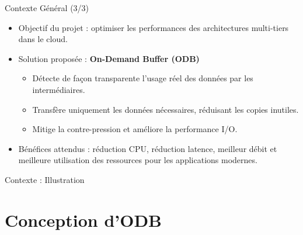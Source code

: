 \documentclass[aspectratio=43,8pt]{beamer}
\begin{document}
\begin{frame}{Contexte Général (3/3)}
    \begin{card}
        \begin{itemize}
            \item Objectif du projet : optimiser les performances des architectures multi-tiers dans le cloud.
            \item Solution proposée : \textbf{On-Demand Buffer (ODB)}
            \begin{itemize}
                \item Détecte de façon transparente l’usage réel des données par les intermédiaires.
                \item Transfère uniquement les données nécessaires, réduisant les copies inutiles.
                \item Mitige la contre-pression et améliore la performance I/O.
            \end{itemize}
            \item Bénéfices attendus : réduction CPU, réduction latence, meilleur débit et meilleure utilisation des ressources pour les applications modernes.
        \end{itemize}
    \end{card}
\end{frame}

\begin{frame}{Contexte : Illustration}
\centering
{}
\end{frame}

\part{Conception d'ODB}
\end{document}
